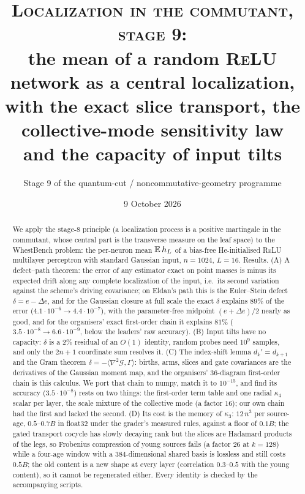 \documentclass[11pt]{article}
\title{\textsc{Localization in the commutant, stage 9:}\\ \large the mean of a random \textsc{ReLU} network as a central localization,\\ with the exact slice transport, the collective-mode sensitivity law\\ and the capacity of input tilts}
\author{Stage 9 of the quantum-cut / noncommutative-geometry programme}
\date{9 October 2026}
\theoremstyle{plain}
\theoremstyle{definition}\newtheorem{definition}[theorem]{Definition}\newtheorem{remark}[theorem]{Remark}\newtheorem{example}[theorem]{Example}
\newcommand{\kap}{\kappa}\newcommand{\Sym}{\operatorname{Sym}}\newcommand{\Hpl}{\mathrm{He}}
\begin{document}
\maketitle
\begin{abstract}
We apply the stage-8 principle (a localization process is a positive martingale in the commutant, whose central part is
the transverse measure on the leaf space) to the WhestBench problem: the per-neuron mean $\mathbb E\,h_L$ of a bias-free
He-initialised \textsc{ReLU} multilayer perceptron with standard Gaussian input, $n=1024$, $L=16$. Results. (A) A
defect--path theorem: the error of any estimator exact on point masses is minus its expected drift along any complete
localization of the input, i.e.\ its second variation against the scheme's driving covariance; on Eldan's path this
is the Euler--Stein defect $\delta=e-\Delta e$, and for the Gaussian closure at full scale the exact $\delta$ explains
$89\%$ of the error ($4.1\cdot10^{-6}\to4.4\cdot10^{-7}$), with the parameter-free midpoint $(e+\Delta e)/2$ nearly as
good, and for the organisers' exact first-order chain it explains $81\%$ ($3.5\cdot10^{-8}\to6.6\cdot10^{-9}$, below the
leaders' raw accuracy). (B) Input tilts have no capacity: $\delta$ is a $2\%$ residual of an $O(1)$ identity, random probes need $10^9$
samples, and only the $2n+1$ coordinate sum resolves it. (C) The index-shift lemma $d_k'=d_{k+1}$ and the Gram
theorem $\delta=-\langle\nabla^2\mathcal G,\Gamma\rangle$: births, arms, slices and gate covariances are the derivatives
of the Gaussian moment map, and the organisers' 36-diagram first-order chain is this calculus. We port that chain to
numpy, match it to $10^{-15}$, and find its accuracy ($3.5\cdot10^{-8}$) rests on two things: the first-order term table
and one radial $\kap_4$ scalar per layer, the scale mixture of the collective mode (a factor $16$); our own chain had
the first and lacked the second. (D) Its cost is the memory of $\kap_3$: $12\,n^3$ per source-age, $0.5$--$0.7B$ in
float32 under the grader's measured rules, against a floor of $0.1B$; the gated transport cocycle has slowly decaying
rank but the slices are Hadamard products of the legs, so Frobenius compression of young sources fails (a factor $26$
at $k=128$) while a four-age window with a $384$-dimensional shared basis is lossless and still costs $0.5B$; the old
content is a new shape at every layer (correlation $0.3$--$0.5$ with the young content), so it cannot be regenerated
either. Every identity is checked by the accompanying scripts.
\end{abstract}
\tableofcontents
\end{document}
